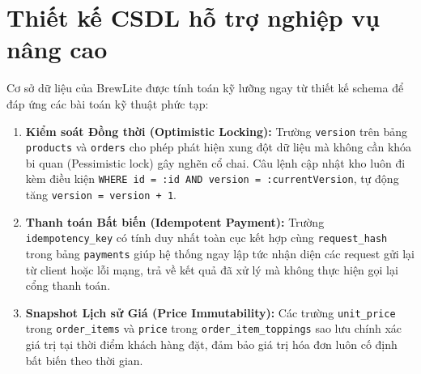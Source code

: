 \section{Thiết kế CSDL hỗ trợ nghiệp vụ nâng cao}
Cơ sở dữ liệu của BrewLite được tính toán kỹ lưỡng ngay từ thiết kế schema để đáp ứng các bài toán kỹ thuật phức tạp:
\begin{enumerate}
    \item \textbf{Kiểm soát Đồng thời (Optimistic Locking):} Trường \texttt{version} trên bảng \texttt{products} và \texttt{orders} cho phép phát hiện xung đột dữ liệu mà không cần khóa bi quan (Pessimistic lock) gây nghẽn cổ chai. Câu lệnh cập nhật kho luôn đi kèm điều kiện \texttt{WHERE id = :id AND version = :currentVersion}, tự động tăng \texttt{version = version + 1}.
    \item \textbf{Thanh toán Bất biến (Idempotent Payment):} Trường \texttt{idempotency\_key} có tính duy nhất toàn cục kết hợp cùng \texttt{request\_hash} trong bảng \texttt{payments} giúp hệ thống ngay lập tức nhận diện các request gửi lại từ client hoặc lỗi mạng, trả về kết quả đã xử lý mà không thực hiện gọi lại cổng thanh toán.
    \item \textbf{Snapshot Lịch sử Giá (Price Immutability):} Các trường \texttt{unit\_price} trong \texttt{order\_items} và \texttt{price} trong \texttt{order\_item\_toppings} sao lưu chính xác giá trị tại thời điểm khách hàng đặt, đảm bảo giá trị hóa đơn luôn cố định bất biến theo thời gian.
\end{enumerate}
